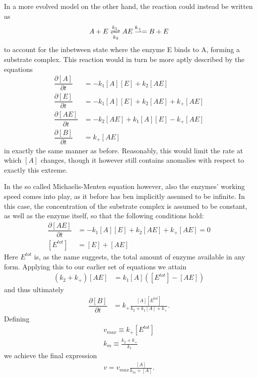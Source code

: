\documentclass[a4paper,12pt]{article}
\newcommand{\partt}[2]{\ensuremath{\dfrac{\partial {#1}}{\partial {#2}}}}
\theoremstyle{plain}
\theoremstyle{definition}
\begin{document}
      In a more evolved model on the other
      hand, the reaction could instead be written as
         \begin{align}
            A + E \xrightleftharpoons[k_2]{k_1} AE \stackrel{k_+}{\rightharpoonup}
            = B + E 
            \label{eq:transition_state}
         \end{align}
      to account for the inbetween state where the enzyme E binds to A, forming
      a substrate complex. This reaction would in turn be more aptly described
      by the equations
         \begin{align*}
            \partt{[A]}{t} &= -k_1[A][E] + k_2[AE] \\
            \partt{[E]}{t} &= -k_1[A][E] + k_2[AE] + k_+[AE] \\
            \partt{[AE]}{t} &= -k_2[AE] + k_1[A][E] - k_+[AE] \\
            \partt{[B]}{t} &= k_+[AE]
         \end{align*}
      in exactly the same manner as before. Reasonably, this would limit the
      rate at which $[A]$ changes, though it however still contains anomalies
      with respect to exactly this extreme.

      In the so called Michaelis-Menten equation however, also the enzymes'
      working speed comes into play, as it before has ben implicitly assumed to
      be infinite. In this case, the concentration of the substrate complex is
      assumed to be constant, as well as the enzyme itself, so that the
      following conditions hold:
         \begin{align*}
            \partt{[AE]}{t} &= -k_1[A][E] + k_2[AE] + k_+[AE] = 0 \\
            [E^{tot}] &= [E] + [AE] 
         \end{align*}
         Here $E^{tot}$ is, as the name suggests, the total amount of enzyme
         available in any form. Applying this to our
         earlier set of equations we attain
         \begin{align*}
            (k_2 + k_+)[AE] &= k_1[A]([E^{tot}] - [AE]) 
         \end{align*}
      and thus ultimately
         \begin{align*}
            \partt{[B]}{t} &= k_+ \frac{[A][E^{tot}]}{k_2 + k_1[A] + k_+}.
         \end{align*}
      Defining 
         \begin{align*}
            v_{max} \equiv k_+ [E^{tot}] \\
            k_m \equiv \frac{k_2 + k_+}{k_1}
         \end{align*}
      we achieve the final expression
         \begin{align*}
            v = v_{max} \frac{[A]}{k_m + [A]}.
         \end{align*}
\end{document}
